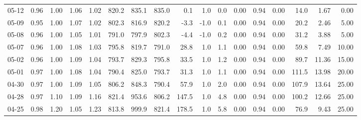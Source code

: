 \begin{threeparttable}
{\begin{tabular}{lrrrrrrrrrrrrrrrr}
  05-12 &         0.96 &           1.00 &          1.06 &          1.02 & 820.2 & 835.1 & 835.0 &        0.1 &                      1.0 &                 0.0 &       0.00 &      0.94 &           0.00 &             14.0 &            1.67 &                   0.00 \\
  05-09 &         0.95 &           1.00 &          1.07 &          1.02 & 802.3 & 816.9 & 820.2 &       -3.3 &                     -1.0 &                 0.1 &       0.00 &      0.94 &           0.00 &             20.2 &            2.46 &                   5.00 \\
  05-08 &         0.96 &           1.00 &          1.05 &          1.01 & 791.0 & 797.9 & 802.3 &       -4.4 &                     -1.0 &                 0.2 &       0.00 &      0.94 &           0.00 &             31.2 &            3.88 &                   5.00 \\
  05-07 &         0.96 &           1.00 &          1.08 &          1.03 & 795.8 & 819.7 & 791.0 &       28.8 &                      1.0 &                 1.1 &       0.00 &      0.94 &           0.00 &             59.8 &            7.49 &                  10.00 \\
  05-02 &         0.96 &           1.00 &          1.09 &          1.04 & 793.7 & 829.3 & 795.8 &       33.5 &                      1.0 &                 1.2 &       0.00 &      0.94 &           0.00 &             89.7 &           11.36 &                  15.00 \\
  05-01 &         0.97 &           1.00 &          1.08 &          1.04 & 790.4 & 825.0 & 793.7 &       31.3 &                      1.0 &                 1.1 &       0.00 &      0.94 &           0.00 &            111.5 &           13.98 &                  20.00 \\
  04-30 &         0.97 &           1.00 &          1.09 &          1.05 & 806.2 & 848.3 & 790.4 &       57.9 &                      1.0 &                 2.0 &       0.00 &      0.94 &           0.00 &            107.9 &           13.64 &                  25.00 \\
  04-28 &         0.97 &           1.10 &          1.09 &          1.16 & 821.4 & 953.6 & 806.2 &      147.5 &                      1.0 &                 4.8 &       0.00 &      0.94 &           0.00 &            100.2 &           12.66 &                  25.00 \\
  04-25 &         0.98 &           1.20 &          1.05 &          1.23 & 813.8 & 999.9 & 821.4 &      178.5 &                      1.0 &                 5.8 &       0.00 &      0.94 &           0.00 &             76.9 &            9.43 &                  25.00 \\

\end{tabular}}
\end{threeparttable}

